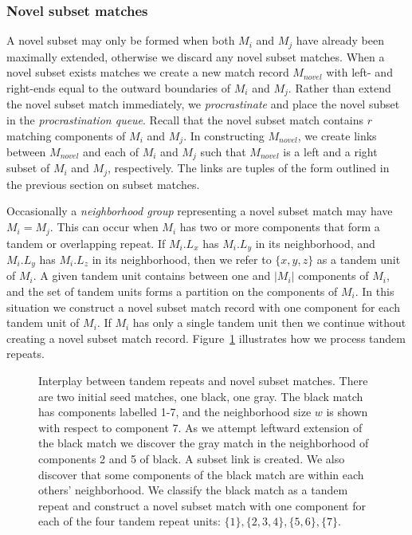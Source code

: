 \documentclass{llncs}
\begin{document}
\subsubsection{Novel subset matches}

A novel subset may only be formed when both $M_i$ and $M_j$ have
already been maximally extended, otherwise we discard any novel
subset matches. When a novel subset exists matches we create a new
match record $M_{novel}$ with left- and right-ends equal to the
outward boundaries of $M_i$ and $M_j$. Rather than extend the novel
subset match immediately, we \textit{procrastinate} and place the
novel subset in the \textit{procrastination queue}. Recall that the
novel subset match contains $r$ matching components of $M_i$ and
$M_j$. In constructing $M_{novel}$, we create links between
$M_{novel}$ and each of $M_i$ and $M_j$ such that $M_{novel}$ is a
left and a right subset of $M_i$ and $M_j$, respectively.  The links
are tuples of the form outlined in the previous section on subset
matches.

Occasionally a \textit{neighborhood group} representing a novel
subset match may have $M_i=M_j$.  This can occur when $M_i$ has
two or more components that form a tandem or overlapping repeat.
If $M_i.L_x$ has $M_i.L_{y}$ in its neighborhood, and $M_i.L_{y}$
has $M_i.L_{z}$ in its neighborhood, then we refer to $\{x,y,z\}$
as a tandem unit of $M_i$.  A given tandem unit contains between
one and $|M_i|$ components of $M_i$, and the set of tandem units
forms a partition on the components of $M_i$. In this situation we
construct a novel subset match record with one component for each
tandem unit of $M_i$.  If $M_i$ has only a single tandem unit then
we continue without creating a novel subset match record.
Figure~\ref{fig:novel} illustrates how we process tandem repeats.


\begin{figure}[t]
\centering {}
\caption{Interplay between tandem repeats and novel subset
matches. There are two initial seed matches, one black, one gray.
The black match has components labelled 1-7, and the neighborhood
size $w$ is shown with respect to component 7. As we attempt
leftward extension of the black match we discover the gray match
in the neighborhood of components 2 and 5 of black. A subset link
is created.  We also discover that some components of the black
match are within each others' neighborhood. We classify the black
match as a tandem repeat and construct a novel subset match with
one component for each of the four tandem repeat units:
$\{1\},\{2,3,4\},\{5,6\},\{7\}$.} \label{fig:novel}
\end{figure}
\end{document}
